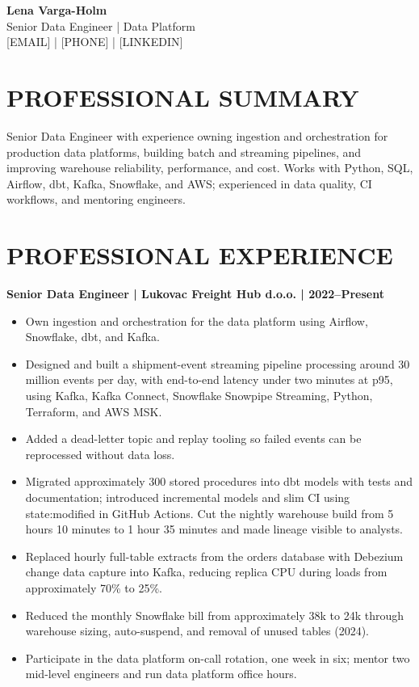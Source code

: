 \documentclass[11pt,a4paper]{article}
\newcommand{\jobline}[1]{\textbf{#1}\par}
\begin{document}
\begin{center}
{\LARGE\bfseries\color{primarycolor} Lena Varga-Holm}\\[0.25em]
{\large Senior Data Engineer | Data Platform}\\[0.25em]
[EMAIL] | [PHONE] | [LINKEDIN]
\end{center}

\section*{PROFESSIONAL SUMMARY}
Senior Data Engineer with experience owning ingestion and orchestration for production data platforms, building batch and streaming pipelines, and improving warehouse reliability, performance, and cost. Works with Python, SQL, Airflow, dbt, Kafka, Snowflake, and AWS; experienced in data quality, CI workflows, and mentoring engineers.

\section*{PROFESSIONAL EXPERIENCE}
\jobline{Senior Data Engineer | Lukovac Freight Hub d.o.o. | 2022–Present}
\begin{itemize}
\item Own ingestion and orchestration for the data platform using Airflow, Snowflake, dbt, and Kafka.
\item Designed and built a shipment-event streaming pipeline processing around 30 million events per day, with end-to-end latency under two minutes at p95, using Kafka, Kafka Connect, Snowflake Snowpipe Streaming, Python, Terraform, and AWS MSK.
\item Added a dead-letter topic and replay tooling so failed events can be reprocessed without data loss.
\item Migrated approximately 300 stored procedures into dbt models with tests and documentation; introduced incremental models and slim CI using state:modified in GitHub Actions. Cut the nightly warehouse build from 5 hours 10 minutes to 1 hour 35 minutes and made lineage visible to analysts.
\item Replaced hourly full-table extracts from the orders database with Debezium change data capture into Kafka, reducing replica CPU during loads from approximately 70\% to 25\%.
\item Reduced the monthly Snowflake bill from approximately 38k to 24k through warehouse sizing, auto-suspend, and removal of unused tables (2024).
\item Participate in the data platform on-call rotation, one week in six; mentor two mid-level engineers and run data platform office hours.
\end{itemize}
\end{document}
